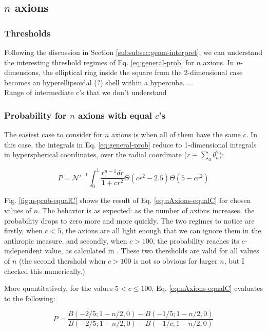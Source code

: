 \documentclass[11pt]{article}
\begin{document}
\subsection{$n$ axions}
\subsubsection{Thresholds}
Following the discussion in Section \ref{subsubsec:geom-interpret}, we can understand the interesting threshold regimes of Eq. \eqref{eq:general-prob} for $n$ axions. In $n$-dimensions, the elliptical ring inside the square from the 2-dimensional case becomes an hyperellipsoidal (?) shell within a hypercube. ... \\
Range of intermediate c's that we don't understand

\subsubsection{Probability for $n$ axions with equal $c$'s}
The easiest case to consider for $n$ axions is when all of them have the same $c$. In this case, the integrals in Eq. \eqref{eq:general-prob} reduce to 1-dimensional integrals in hyperspherical coordinates, over the radial coordinate ($r\equiv\sum_a\theta_a^2$):

\begin{equation}
    \label{eq:nAxions-equalC}
         P = \mathcal{N'}^{-1} \int_{0}^1 \frac{r^{n-1} dr}{1+c r^2}\Theta(c r^2-2.5)\Theta(5-c r^2)
\end{equation}

Fig. \ref{fig:n-prob-equalC} shows the result of Eq. \eqref{eq:nAxions-equalC} for chosen values of $n$. The behavior is as expected: as the number of axions increases, the probability drops to zero more and more quickly. The two regimes to notice are firstly, when $c<5$, the axions are all light enough that we can ignore them in the anthropic measure, and secondly, when $c>100$, the probability reaches its $c$-independent value, as calculated in \cite{exploring-string-axiverse}. These two thersholds are valid for all values of $n$ (the second thershold when $c>100$ is not so obvious for larger $n$, but I checked this numerically.)

More quantitatively, for the values $5<c\leq 100$, Eq. \eqref{eq:nAxions-equalC} evaluates to the following:

\begin{equation}
    P = \frac{B(-2/5;1-n/2,0)-B(-1/5;1-n/2,0)}{B(-2/5;1-n/2,0)-B(-1/c;1-n/2,0)}
\end{equation}
\end{document}
